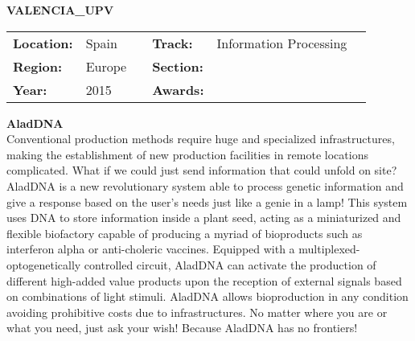 \textbf{\uppercase{Valencia\_UPV}}
\FloatBarrier
\begin{table}[h]
\begin{tabular}{lp{2.5cm}llll}
\textbf{Location:} & Spain & \multicolumn{1}{|l}{} & \textbf{Track:}   & Information Processing \\
\textbf{Region:}   & Europe   & \multicolumn{1}{|l}{} & \textbf{Section:} &  \\
\textbf{Year:}     & 2015   & \multicolumn{1}{|l}{} & \textbf{Awards:}  &
\end{tabular}
\end{table}
\FloatBarrier
\noindent	\textbf{AladDNA} \vspace{.2cm}\\
Conventional production methods require huge and specialized infrastructures, making the establishment of new production facilities in remote locations complicated. What if we could just send information that could unfold on site? 
AladDNA is a new revolutionary system able to process genetic information and give a response based on the user’s needs just like a genie in a lamp! This system uses DNA to store information inside a plant seed, acting as a miniaturized and flexible biofactory capable of producing a myriad of bioproducts such as interferon alpha or anti-choleric vaccines. Equipped with a multiplexed-optogenetically controlled circuit, AladDNA can activate the production of different high-added value products upon the reception of external signals based on combinations of light stimuli.
AladDNA allows bioproduction in any condition avoiding prohibitive costs due to infrastructures. 
No matter where you are or what you need, just ask your wish! Because AladDNA has no frontiers!
\vspace{2cm}

